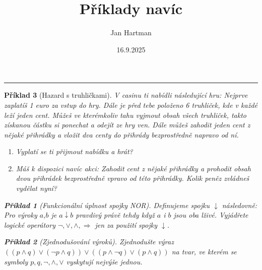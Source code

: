 \documentclass[10pt]{article}
\title{Příklady navíc}
\author{Jan Hartman}
\date{16.9.2025}
\newcommand{\titlerule}{%
    \noindent %
    \makebox[\textwidth]{\large \thetitle \hfill \thedate}
    \rule{\textwidth}{0.4pt}%
}
\theoremstyle{definitionstyle}
\theoremstyle{problemstyle}
\newtheorem{problem}{Příklad}
\begin{document}
\titlerule

\begin{problem}[Hazard s truhličkami]
V casinu ti nabídli následující hru: Nejprve zaplatíš 1 euro za vstup do hry. Dále je před tebe položeno 6 truhliček, kde v každé leží jeden cent. Můžeš ve kterémkoliv tahu vyjmout obsah všech truhliček, takto získanou částku si ponechat a odejít ze hry ven. Dále můžeš zahodit jeden cent z nějaké přihrádky a vložit dva centy do přihrády bezprostředně napravo od ní.

\begin{enumerate}[label=(\alph*)]
\item Vyplatí se ti přijmout nabídku a hrát?
\item Máš k dispozici navíc akci: Zahodit cent z nějaké přihrádky a prohodit obsah dvou přihrádek bezprostředně vpravo od této přihrádky. Kolik peněz zvládneš vydělat nyní?
\end{enumerate}

\begin{problem}[Funkcionální úplnost spojky NOR]
Definujeme spojku $\downarrow$ následovně: Pro výroky $a$,$b$ je $a \downarrow b$ pravdivý právě tehdy když $a$ i $b$ jsou oba lživé. Vyjádřete logické operátory $\neg, \vee, \wedge, \Rightarrow$ jen za použití spojky $\downarrow$. 
\end{problem}

\begin{problem}[Zjednodušování výroků]
Zjednodušte výraz $((p \wedge q) \vee (\neg p \wedge q) ) \vee ( (p \wedge \neg q) \vee (p \wedge q)  )$ na tvar, ve kterém se symboly $p,q,\neg,\wedge,\vee$ vyskytují nejvýše jednou.
\end{problem}

\end{problem}
\end{document}
